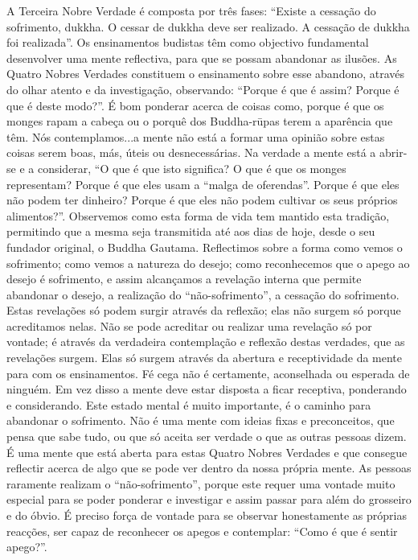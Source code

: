 A Terceira Nobre Verdade é composta por três fases:
“Existe a cessação do sofrimento, dukkha. O cessar de dukkha
deve ser realizado. A cessação de dukkha foi realizada”.
Os ensinamentos budistas têm como objectivo fundamental desenvolver uma mente reflectiva, para que se possam
abandonar as ilusões. As Quatro Nobres Verdades constituem
o ensinamento sobre esse abandono, através do olhar atento e
da investigação, observando: “Porque é que é assim? Porque
é que é deste modo?”.
É bom ponderar acerca de coisas como, porque é que os
monges rapam a cabeça ou o porquê dos Buddha-rūpas terem
a aparência que têm. Nós contemplamos...a mente não está a
formar uma opinião sobre estas coisas serem boas, más, úteis
ou desnecessárias. Na verdade a mente está a abrir-se e a
considerar, “O que é que isto significa? O que é que os monges
representam? Porque é que eles usam a “malga de oferendas”.
Porque é que eles não podem ter dinheiro? Porque é que eles
não podem cultivar os seus próprios alimentos?”.
Observemos como esta forma de vida tem mantido esta
tradição, permitindo que a mesma seja transmitida até aos
dias de hoje, desde o seu fundador original, o Buddha
Gautama.
Reflectimos sobre a forma como vemos o sofrimento;
como vemos a natureza do desejo; como reconhecemos que o
apego ao desejo é sofrimento, e assim alcançamos a revelação
interna que permite abandonar o desejo, a realização do “não-sofrimento”, a cessação do sofrimento. Estas revelações só
podem surgir através da reflexão; elas não surgem só porque
acreditamos nelas. Não se pode acreditar ou realizar uma revelação só por vontade; é através da verdadeira contemplação e
reflexão destas verdades, que as revelações surgem. Elas só
surgem através da abertura e receptividade da mente para
com os ensinamentos. Fé cega não é certamente, aconselhada
ou esperada de ninguém. Em vez disso a mente deve estar
disposta a ficar receptiva, ponderando e considerando.
Este estado mental é muito importante, é o caminho para
abandonar o sofrimento. Não é uma mente com ideias fixas e
preconceitos, que pensa que sabe tudo, ou que só aceita ser
verdade o que as outras pessoas dizem. É uma mente que está
aberta para estas Quatro Nobres Verdades e que consegue
reflectir acerca de algo que se pode ver dentro da nossa
própria mente.
As pessoas raramente realizam o “não-sofrimento”,
porque este requer uma vontade muito especial para se poder
ponderar e investigar e assim passar para além do grosseiro e
do óbvio. É preciso força de vontade para se observar
honestamente as próprias reacções, ser capaz de reconhecer
os apegos e contemplar: “Como é que é sentir apego?”.
